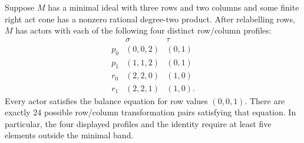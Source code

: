 \begin{lemma}
\label{C:three-row-forced-profiles}
Suppose $M$ has a minimal ideal with three rows and two columns and
some finite right act cone has a nonzero rational degree-two
product.  After relabelling rows, $M$ has actors with each of
the following four distinct row/column profiles:
\[
\begin{array}{c|c|c}
 &\sigma&\tau\\ \hline
 p_0&(0,0,2)&(0,1)\\
 p_1&(1,1,2)&(0,1)\\
 r_0&(2,2,0)&(1,0)\\
 r_1&(2,2,1)&(1,0).
\end{array}
\]
Every actor satisfies the balance equation for row values
$(0,0,1)$.  There are exactly $24$ possible row/column
transformation pairs satisfying that equation.  In particular,
the four displayed profiles and the identity require at least
five elements outside the minimal band.
\end{lemma}
